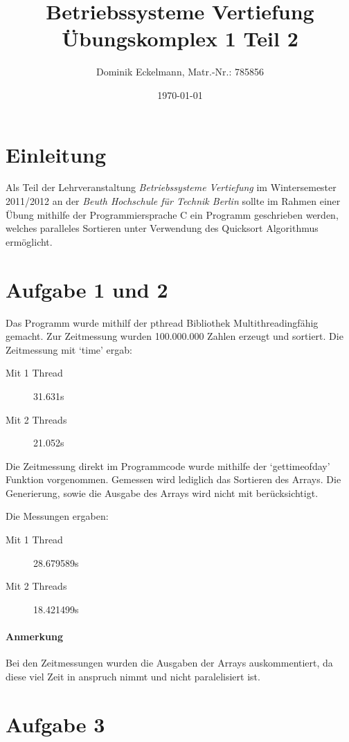 \documentclass[a4paper]{article}
\title{Betriebssysteme Vertiefung \\ Übungskomplex 1 Teil 2}
\author{Dominik Eckelmann, Matr.-Nr.: 785856}
\date{\today}
\begin{document}
\maketitle

\tableofcontents

\section{Einleitung}
Als Teil der Lehrveranstaltung \textit{Betriebssysteme Vertiefung} im Wintersemester 2011/2012 an der \textit{Beuth Hochschule für Technik Berlin} sollte im Rahmen einer Übung mithilfe der Programmiersprache C ein Programm geschrieben werden, welches paralleles Sortieren unter Verwendung
des Quicksort Algorithmus ermöglicht.

\section{Aufgabe 1 und 2}

Das Programm wurde mithilf der pthread Bibliothek Multithreadingfähig gemacht.
Zur Zeitmessung wurden 100.000.000 Zahlen erzeugt und sortiert.
Die Zeitmessung mit `time' ergab:

\begin{description}
\item[Mit 1 Thread] 31.631s
\item[Mit 2 Threads] 21.052s
\end{description}

Die Zeitmessung direkt im Programmcode wurde mithilfe der `gettimeofday' Funktion vorgenommen.
Gemessen wird lediglich das Sortieren des Arrays.
Die Generierung, sowie die Ausgabe des Arrays wird nicht mit berücksichtigt.

Die Messungen ergaben:
\begin{description}
\item[Mit 1 Thread] 28.679589s
\item[Mit 2 Threads] 18.421499s
\end{description}

\paragraph{Anmerkung} Bei den Zeitmessungen wurden die Ausgaben der Arrays auskommentiert,
da diese viel Zeit in anspruch nimmt und nicht paralelisiert ist.

\section{Aufgabe 3}
\end{document}
